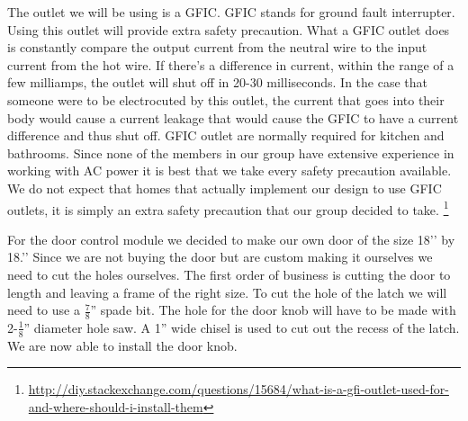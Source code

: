 The outlet we will be using is a GFIC. GFIC stands for ground fault
interrupter. Using this outlet will provide extra safety precaution. What a
GFIC outlet does is constantly compare the output current from the neutral wire
to the input current from the hot wire. If there{}'s a difference in current,
within the range of a few milliamps, the outlet will shut off in 20-30
milliseconds. In the case that someone were to be electrocuted by this outlet,
the current that goes into their body would cause a current leakage that would
cause the GFIC to have a current difference and thus shut off.  GFIC outlet are
normally required for kitchen and bathrooms. Since none of the members in our
group have extensive experience in working with AC power it is best that we
take every safety precaution available. We do not expect that homes that
actually implement our design to use GFIC outlets, it is simply an extra safety
precaution that our group decided to take. \footnote{\url{http://diy.stackexchange.com/questions/15684/what-is-a-gfi-outlet-used-for-and-where-should-i-install-them}}


For the door control module we decided to make our own door of the size 18'{}'
by 18.'{}' Since we are not buying the door but are custom making it ourselves
we need to cut the holes ourselves. The first order of business is cutting the
door to length and leaving a frame of the right size. To cut the hole of the
latch we will need to use a $\frac78$'' spade bit. The hole for the door knob
will have to be made with 2-$\frac18$'' diameter hole saw. A 1'' wide chisel is
used to cut out the recess of the latch. We are now able to install the door
knob.
